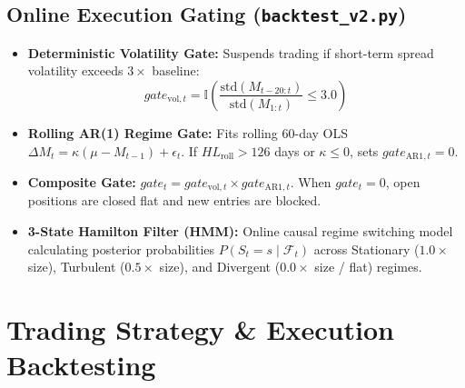 \documentclass[11pt, a4paper]{article}
\begin{document}
\subsection{Online Execution Gating (\texttt{backtest\_v2.py})}
\begin{itemize}
    \item \textbf{Deterministic Volatility Gate:} Suspends trading if short-term spread volatility exceeds $3\times$ baseline:
    \begin{equation}
        gate_{\text{vol}, t} = \mathbb{I}\left( \frac{\text{std}(M_{t-20:t})}{\text{std}(M_{1:t})} \le 3.0 \right)
    \end{equation}
    \item \textbf{Rolling AR(1) Regime Gate:} Fits rolling 60-day OLS $\Delta M_t = \kappa (\mu - M_{t-1}) + \epsilon_t$. If $HL_{\text{roll}} > 126$ days or $\kappa \le 0$, sets $gate_{\text{AR1}, t} = 0$.
    \item \textbf{Composite Gate:} $gate_t = gate_{\text{vol}, t} \times gate_{\text{AR1}, t}$. When $gate_t = 0$, open positions are closed flat and new entries are blocked.
    \item \textbf{3-State Hamilton Filter (HMM):} Online causal regime switching model calculating posterior probabilities $P(S_t = s \mid \mathcal{F}_t)$ across Stationary ($1.0\times$ size), Turbulent ($0.5\times$ size), and Divergent ($0.0\times$ size / flat) regimes.
\end{itemize}

\section{Trading Strategy \& Execution Backtesting}
\end{document}

